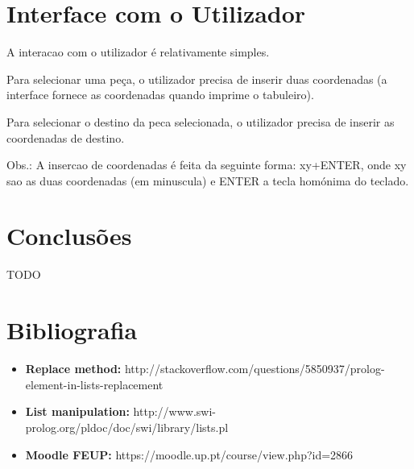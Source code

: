 \newpage

\section{Interface com o Utilizador}

A interacao com o utilizador é relativamente simples.

Para selecionar uma peça, o utilizador precisa de inserir duas coordenadas
(a interface fornece as coordenadas quando imprime o tabuleiro).

Para selecionar o destino da peca selecionada, o utilizador precisa de inserir as coordenadas de destino.

Obs.: A insercao de coordenadas é feita da seguinte forma: xy+ENTER, onde xy sao as duas coordenadas (em minuscula)
e ENTER a tecla homónima do teclado.

\vspace{1cm}

\section{Conclusões}

TODO

\newpage

\section{Bibliografia}

\vspace{1cm}

\begin{itemize}
  \item{\textbf{Replace method:} http://stackoverflow.com/questions/5850937/prolog-element-in-lists-replacement}
  \item{\textbf{List manipulation:} http://www.swi-prolog.org/pldoc/doc/swi/library/lists.pl}
  \item{\textbf{Moodle FEUP:} https://moodle.up.pt/course/view.php?id=2866}
\end{itemize}


